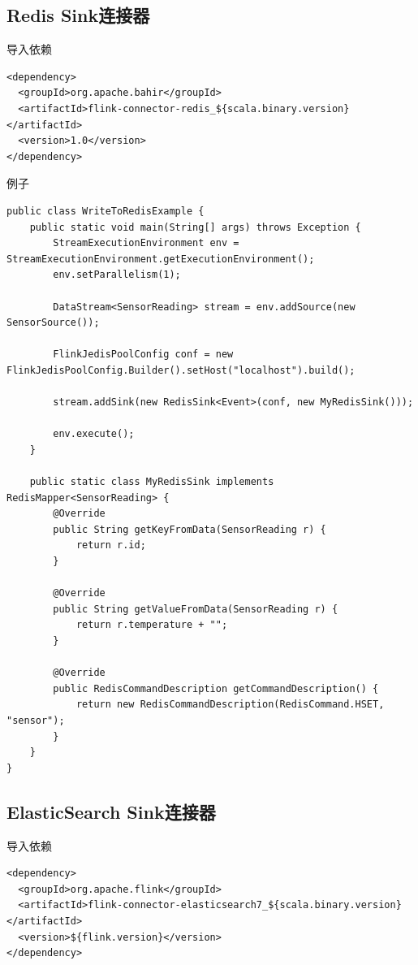 \documentclass[cn,11pt,chinese]{elegantbook}
\begin{document}
\subsection{Redis Sink连接器}

导入依赖

\begin{verbatim}
<dependency>
  <groupId>org.apache.bahir</groupId>
  <artifactId>flink-connector-redis_${scala.binary.version}</artifactId>
  <version>1.0</version>
</dependency>
\end{verbatim}

例子

\begin{verbatim}
public class WriteToRedisExample {
    public static void main(String[] args) throws Exception {
        StreamExecutionEnvironment env = StreamExecutionEnvironment.getExecutionEnvironment();
        env.setParallelism(1);

        DataStream<SensorReading> stream = env.addSource(new SensorSource());

        FlinkJedisPoolConfig conf = new FlinkJedisPoolConfig.Builder().setHost("localhost").build();

        stream.addSink(new RedisSink<Event>(conf, new MyRedisSink()));

        env.execute();
    }

    public static class MyRedisSink implements RedisMapper<SensorReading> {
        @Override
        public String getKeyFromData(SensorReading r) {
            return r.id;
        }

        @Override
        public String getValueFromData(SensorReading r) {
            return r.temperature + "";
        }

        @Override
        public RedisCommandDescription getCommandDescription() {
            return new RedisCommandDescription(RedisCommand.HSET, "sensor");
        }
    }
}
\end{verbatim}

\subsection{ElasticSearch Sink连接器}

导入依赖

\begin{verbatim}
<dependency>
  <groupId>org.apache.flink</groupId>
  <artifactId>flink-connector-elasticsearch7_${scala.binary.version}</artifactId>
  <version>${flink.version}</version>
</dependency>
\end{verbatim}
\end{document}
